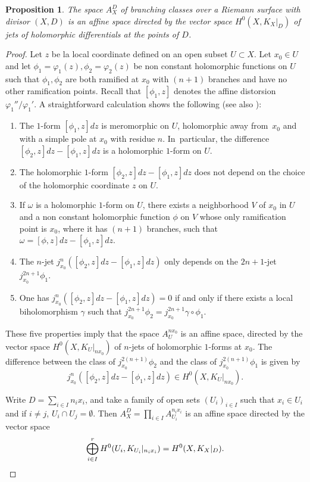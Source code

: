 \documentclass[JEP,XML,SOM,Unicode,NoEqCountersInSection,published]{cedram}
\theoremstyle{definition}
\theoremstyle{plain}
\newtheorem{proposition}[definition]{Proposition}
\begin{document}
\begin{proposition}\label{proposition_affine_structure_branching_classes}
The space $A_X^D$ of branching classes over a Riemann surface with divisor $(X, D)$ is an affine space directed by the vector space $H^0\left(X, K_X|_D\right)$ of jets of holomorphic differentials at the points of $D$.
\end{proposition}

\begin{proof}
Let $z$ be la local coordinate defined on an open subset $U \subset X$.
Let $x_0 \in U$ and let $\phi_1 = \varphi_1(z), \phi_2 = \varphi_2(z)$ be non constant holomorphic functions on $U$ such that $\phi_1, \phi_2$ are both ramified at $x_0$ with $(n+1)$ branches and have no other ramification points.
Recall that $[\phi_1, z]$ denotes the affine distorsion $\varphi_1''/\varphi_1'$.
A straightforward calculation shows the following (see also \cite{gunning}):
\begin{enumerate}
\item
The $1$-form $[\phi_1, z]dz$ is meromorphic on $U$, holomorphic away from~$x_0$ and with a simple pole at $x_0$ with residue $n$. In~particular, the difference $[\phi_2, z]dz - [\phi_1, z]dz$ is a holomorphic $1$-form on $U$.
\item
The holomorphic $1$-form $[\phi_2, z]dz - [\phi_1, z]dz$ does not depend on the choice of the holomorphic coordinate $z$ on $U$.
\item
If $\omega$ is a holomorphic $1$-form on $U$, there exists a neighborhood $V$ of $x_0$ in $U$ and a non constant holomorphic function $\phi$ on $V$ whose only ramification point is $x_0$, where it has $(n+1)$ branches, such that $\omega = [\phi, z]dz - [\phi_1, z]dz$.
\item
The $n$-jet $j_{x_0}^n\left([\phi_2, z]dz - [\phi_1, z]dz\right)$ only depends on the $2n+1$-jet $j_{x_0}^{2n+1}\phi_1$.
\item
One has $j_{x_0}^n\left([\phi_2, z]dz - [\phi_1, z]dz\right) = 0$ if and only if there exists a local biholomorphism $\gamma$ such that $j_{x_0}^{2n+1}\phi_2 = j_{x_0}^{2n+1}\gamma \circ \phi_1$.
\end{enumerate}

These five properties imply that the space $A_U^{nx_0}$ is an affine space, directed by the vector space $H^0\left(X, K_U|_{nx_0}\right)$ of $n$-jets of holomorphic $1$-forms at $x_0$.
The difference between the class of $j_{x_0}^{2(n+1)} \phi_2$ and the class of $j_{x_0}^{2(n+1)} \phi_1$ is given by
\[
j_{x_0}^n([\phi_2, z]dz - [\phi_1, z]dz) \in H^0(X, K_U|_{nx_0}).
\]

Write $D = \sum_{i \in I} n_i x_i$, and take a family of open sets $(U_i)_{i \in I}$ such that $x_i \in U_i$ and if $i \neq j$, $U_i \cap U_j = \emptyset$.
Then $A_X^D = \prod_{i \in I} A_{U_i}^{n_ix_i}$ is an affine space directed by the vector space
\[
\bigoplus_{i \in I}^r H^0(U_i, K_{U_i}|_{n_ix_i}) = H^0(X, K_X|_D).\qedhere
\]
\end{proof}
\end{document}
